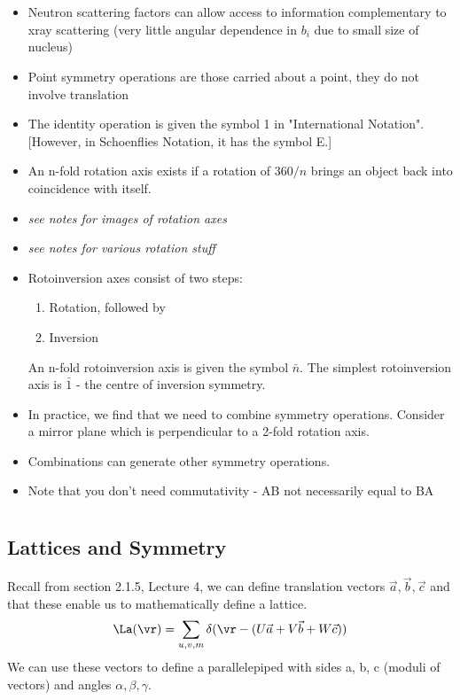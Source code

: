 \documentclass[a4paper, 11pt, normalem]{report}
\begin{document}
\chapter{}

\begin{itemize}
    \item Neutron scattering factors can allow access to information complementary to xray scattering
        (very little angular dependence in $b_i$ due to small size of nucleus)
    \item Point symmetry operations are those carried about a point, they do not involve translation
    \item The identity operation is given the symbol 1 in "International Notation". [However, in Schoenflies Notation, it has the symbol E.]
    \item An n-fold rotation axis exists if a rotation of $360/n$ brings an object back into coincidence with itself.
    \item \textit{see notes for images of rotation axes}
    \item \textit{see notes for various rotation stuff}
    \item Rotoinversion axes consist of two steps:
        \begin{enumerate}
            \item Rotation, followed by
            \item Inversion
        \end{enumerate}
        \vspace{8pt}
        An n-fold rotoinversion axis is given the symbol $\bar{n}$.
        The simplest rotoinversion axis is $\bar{1}$ - the centre of inversion symmetry.
    \item In practice, we find that we need to combine symmetry operations.
        Consider a mirror plane which is perpendicular to a 2-fold rotation axis.
    \item Combinations can generate other symmetry operations.
    \item Note that you don't need commutativity - AB not necessarily equal to BA
\end{itemize}

\chapter{}

\section{Lattices and Symmetry}
Recall from section 2.1.5, Lecture 4, we can define translation vectors $\vec{a},\vec{b},\vec{c}$ and that these enable us to mathematically define a lattice.
\begin{equation}
    \La(\vr) = \sum_{u,v,m} \delta(\vr - (U\vec{a} + V\vec{b} + W\vec{c}))
\end{equation}
We can use these vectors to define a parallelepiped with sides a, b, c (moduli of vectors) and angles $\alpha, \beta, \gamma$.
\end{document}
